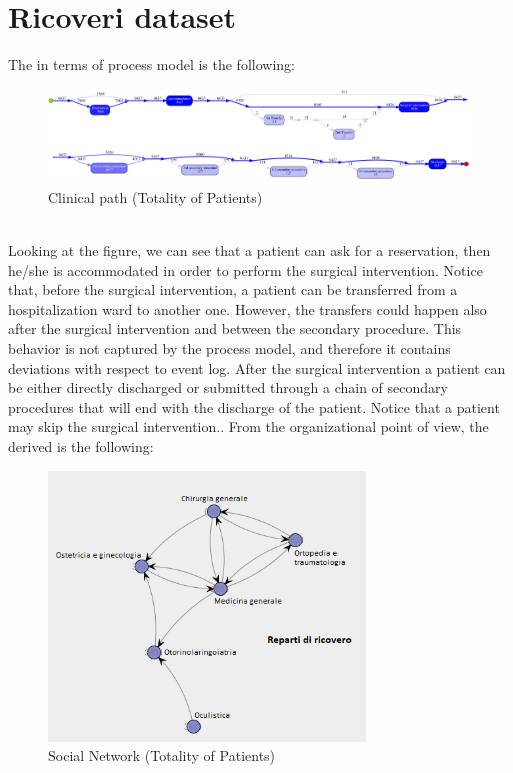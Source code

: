\section{Ricoveri dataset}\label{analysis:3}
The  in terms of process model is the following:
\begin{figure} [htbp]
\includegraphics[width=\textwidth]{RicoveriProcessModel2}
\caption{Clinical path (Totality of Patients)}
\end{figure}\\
Looking at the figure, we can see that a patient can ask for a reservation, then he/she is accommodated in order to perform the surgical intervention. Notice that, before the surgical intervention, a patient can be transferred from a hospitalization ward to another one. However, the transfers could happen also after the surgical intervention and between the secondary procedure. This behavior is not captured by the process model, and therefore it contains deviations with respect to event log. After the surgical intervention a patient can be either directly discharged or submitted through a chain of secondary procedures that will end with the discharge
of the patient. Notice that a patient may skip the surgical intervention.. From the organizational point of view, the derived  is the following:
\begin{figure} [htbp]
\includegraphics[width=0.75\textwidth]{RicoveriSocialNetwork}
\caption{Social Network (Totality of Patients)}
\end{figure}\\
